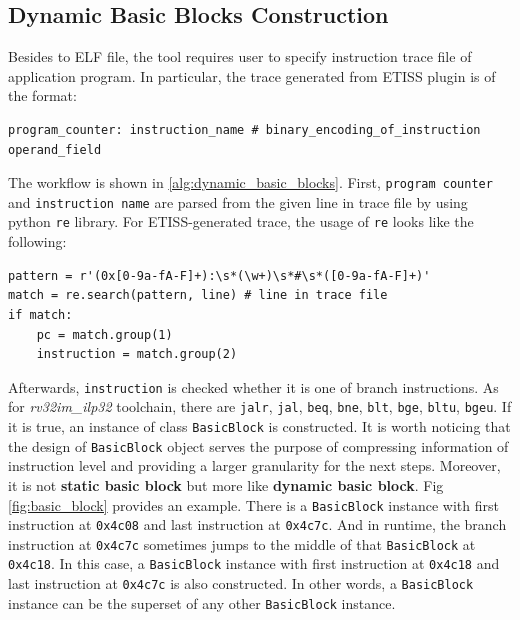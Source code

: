 \subsection{Dynamic Basic Blocks Construction}
\label{subsec:bb_construction}

Besides to ELF file, the tool requires user to specify instruction trace file of application program. In particular, the trace generated from ETISS plugin is of the format:  

\medskip
\begin{lstlisting}
program_counter: instruction_name # binary_encoding_of_instruction operand_field    
\end{lstlisting}

The workflow is shown in \ref{alg:dynamic_basic_blocks}. First, \texttt{program counter} and \texttt{instruction name} are parsed from the given line in trace file by using python \texttt{re} library. For ETISS-generated trace, the usage of \texttt{re} looks like the following:

\medskip
\begin{lstlisting}
pattern = r'(0x[0-9a-fA-F]+):\s*(\w+)\s*#\s*([0-9a-fA-F]+)'
match = re.search(pattern, line) # line in trace file
if match:
    pc = match.group(1)
    instruction = match.group(2)
\end{lstlisting}
\medskip

Afterwards, \texttt{instruction} is checked whether it is one of branch instructions. As for \textit{rv32im\_ilp32} toolchain, there are \texttt{jalr}, \texttt{jal}, \texttt{beq}, \texttt{bne}, \texttt{blt}, \texttt{bge}, \texttt{bltu}, \texttt{bgeu}. If it is true, an instance of class \texttt{BasicBlock} is constructed. It is worth noticing that the design of  \texttt{BasicBlock} object serves the purpose of compressing information of instruction level and providing a larger granularity for the next steps. Moreover, it is not \textbf{static basic block} but more like \textbf{dynamic basic block}. Fig \ref{fig:basic_block} provides an example. There is a \texttt{BasicBlock} instance with first instruction at \texttt{0x4c08} and last instruction at \texttt{0x4c7c}. And in runtime, the branch instruction at \texttt{0x4c7c} sometimes jumps to the middle of that \texttt{BasicBlock} at \texttt{0x4c18}. In this case, a \texttt{BasicBlock} instance with first instruction at \texttt{0x4c18} and last instruction at \texttt{0x4c7c} is also constructed. In other words, a \texttt{BasicBlock} instance can be the superset of any other \texttt{BasicBlock} instance.

